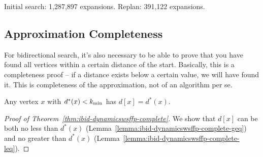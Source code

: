 \begin{marginfigure}%
   \centering%
   
   \caption{Initial search: 1,287,897 expansions.
      Replan: 391,122 expansions.}%
\end{marginfigure}

\subsection{Approximation Completeness}

For bidirectional search,
it's also necessary to be able to prove that you have found
all vertices within a certain distance of the start.
Basically, this is a completeness proof --
if a distance exists below a certain value,
we will have found it.
This is completeness of the approximation,
not of an algorithm per se.

\begin{theorem}
Any vertex $x$ with $d^*(x) < k_{\mbox{\scriptsize min}}$
has $d[x] = d^*(x)$.
\label{thm:ibid-dynamicswsffp-complete}
\end{theorem}

\begin{proof}[Proof of Theorem~\ref{thm:ibid-dynamicswsffp-complete}]
We show that $d[x]$ can be both
no less than $d^*(x)$
(Lemma~\ref{lemma:ibid-dynamicswsffp-complete-geq})
and no greater than $d^*(x)$
(Lemma~\ref{lemma:ibid-dynamicswsffp-complete-leq}).
\end{proof}

